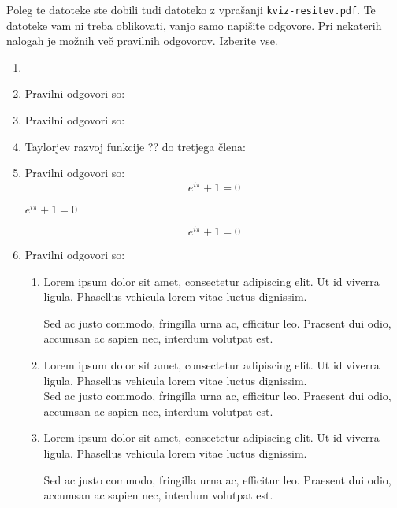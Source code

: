 \documentclass[11pt]{article}
\begin{document}
Poleg te datoteke ste dobili tudi datoteko z vprašanji \texttt{kviz-resitev.pdf}.
Te datoteke vam ni treba oblikovati, vanjo samo napišite odgovore.
Pri nekaterih nalogah je možnih več pravilnih odgovorov. Izberite vse.

\begin{enumerate}
    \item %

    \item Pravilni odgovori so: %
    
    \item Pravilni odgovori so: %
    
    \item Taylorjev razvoj funkcije ?? do tretjega člena:

    \item Pravilni odgovori so:  %
      \[ e^{i \pi} + 1 = 0 \]
      \begin{center}
          \( e^{i \pi} + 1 = 0 \)
      \end{center}
      \begin{equation*}
          e^{i \pi} + 1 = 0
      \end{equation*}

    \item Pravilni odgovori so: %
        \begin{enumerate}
            \item {
                Lorem ipsum dolor sit amet, consectetur adipiscing elit. Ut id viverra ligula. Phasellus vehicula lorem vitae luctus dignissim. 
                
                Sed ac justo commodo, fringilla urna ac, efficitur leo. Praesent dui odio, accumsan ac sapien nec, interdum volutpat est. 
            }
            \item {
                Lorem ipsum dolor sit amet, consectetur adipiscing elit. Ut id viverra ligula. Phasellus vehicula lorem vitae luctus dignissim. \\
                Sed ac justo commodo, fringilla urna ac, efficitur leo. Praesent dui odio, accumsan ac sapien nec, interdum volutpat est. 
            }
            \item {
                Lorem ipsum dolor sit amet, consectetur adipiscing elit. Ut id viverra ligula. Phasellus vehicula lorem vitae luctus dignissim. \par
                Sed ac justo commodo, fringilla urna ac, efficitur leo. Praesent dui odio, accumsan ac sapien nec, interdum volutpat est. 
            }
        \end{enumerate}
    

\end{enumerate}
\end{document}
